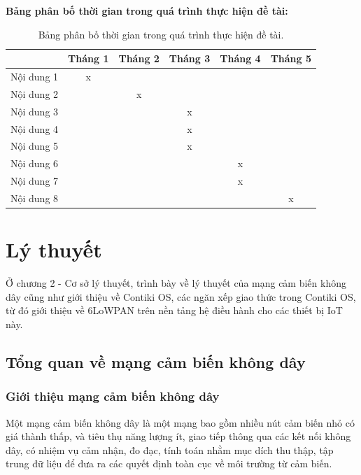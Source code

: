 \documentclass{report}
\begin{document}
\textbf{Bảng phân bố thời gian trong quá trình thực hiện đề tài:} 
\begin{table}[h]
\centering
\caption{Bảng phân bố thời gian trong quá trình thực hiện đề tài.}
\label{tab:tb1}
\begin{tabular}{|c|c|c|c|c|c|}
	\hline
	& \textbf{Tháng 1} & \textbf{Tháng 2} & \textbf{Tháng 3} & \textbf{Tháng 4} & \textbf{Tháng 5} \\ \hline
	Nội dung 1 & x                &                  &                  &                  &                  \\ \hline
	Nội dung 2 &                  & x                &                  &                  &                  \\ \hline
	Nội dung 3 &                  &                  & x                &                  &                  \\ \hline
	Nội dung 4 &                  &                  & x                &                  &                  \\ \hline
	Nội dung 5 &                  &                  & x                &                  &                  \\ \hline
	Nội dung 6 &                  &                  &                  & x                &                  \\ \hline
	Nội dung 7 &                  &                  &                  & x                &                  \\ \hline
	Nội dung 8 &                  &                  &                  &                  & x                \\ \hline
\end{tabular}
\end{table}
\newpage
\chapter{Lý thuyết}
\noindent
Ở chương 2 - Cơ sở lý thuyết, trình bày về lý thuyết của mạng cảm biến không dây cũng như
giới thiệu về Contiki OS, các ngăn xếp giao thức trong Contiki OS, từ đó giới thiệu về
6LoWPAN trên nền tảng hệ điều hành cho các thiết bị IoT này.
\section{Tổng quan về mạng cảm biến không dây}
\subsection{Giới thiệu mạng cảm biến không dây}
Một mạng cảm biến không dây là một mạng bao gồm nhiều nút cảm biến nhỏ có giá thành
thấp, và tiêu thụ năng lượng ít, giao tiếp thông qua các kết nối không dây, có nhiệm vụ cảm
nhận, đo đạc, tính toán nhằm mục dích thu thập, tập trung đữ liệu để đưa ra các quyết định
toàn cục về môi trường từ cảm biến. \\
\end{document}
